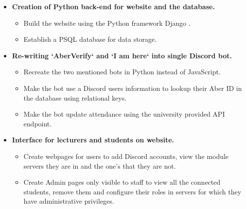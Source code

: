 \begin{itemize}
	\item \textbf{Creation of Python back-end for website and the database.}
	\begin{itemize}
		\item Build the website using the Python framework Django \cite{Django}.
		\item Establish a PSQL \cite{psql} database for data storage.
	\end{itemize}
	
	\item \textbf{Re-writing `AberVerify` and `I am here` into single Discord bot.}
	\begin{itemize}
		\item Recreate the two mentioned bots in Python instead of JavaScript.
		\item Make the bot use a Discord users information to lookup their Aber ID in the database using relational keys.
		\item Make the bot update attendance using the university provided API endpoint.
	\end{itemize}
	
	\item \textbf{Interface for lecturers and students on website.}
	\begin{itemize}
		\item Create webpages for users to add Discord accounts, view the module servers they are in and the one's that they are not. 
		\item Create Admin pages only visible to staff to view all the connected students, remove them and configure their roles in servers for which they have administrative privileges.
	\end{itemize}
	

\end{itemize}
